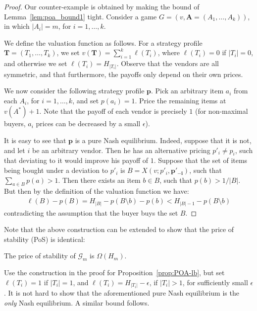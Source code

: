 \begin{proof}
Our counter-example is obtained by making the bound of
Lemma~\ref{lem:poa_bound1} tight. Consider a game $G =
(v,\mathbf{A}=(A_1,\ldots,A_k))$, in which $|A_i|=m$, for
$i=1,\ldots,k$.

We define the valuation function as follows. For a strategy
profile $\mathbf{T}=(T_1,\ldots,T_k)$, we set
$v(\mathbf{T})=\sum_{i=1}^k\ell(T_i)$, where $\ell(T_i)=0$ if
$|T_i|=0$, and otherwise we set $\ell(T_i)=H_{|T_i|}$. Observe that the vendors are all symmetric, and that
furthermore, the payoffs only depend on their own prices.

We now consider the following strategy profile $\mathbf{p}$.
Pick an arbitrary item
$a_i$ from each $A_i$, for $i=1,\ldots,k$, and set $p(a_i)=1$. Price the
remaining items at $v(A^*)+1$. Note that the payoff
of each vendor is precisely $1$ (for non-maximal buyers, $a_i$ prices can be decreased by a small $\epsilon$).

It is easy to see that $\mathbf{p}$ is a pure Nash
equilibrium. Indeed, suppose that it is not, and let $i$ be an
arbitrary vendor. Then he has an
alternative pricing $p'_i \neq p_i$, such that deviating to it would
improve his payoff of $1$. Suppose that the set of items being bought under a deviation
to $p'_i$ is $B=X(v;p'_i,\mathbf{p'_{-i}})$, such that $\sum_{a \in B}p(a)>1$. Then
there exists an item $b \in B$, such that $p(b) > 1/|B|$. But then by the
definition of the valuation function we have:
\small
\begin{align*}
  \ell(B) - p(B) = H_{|B|} - p(B \setminus b) - p(b) <
  H_{|B|-1} - p(B \setminus b)
\end{align*}
\normalsize
contradicting the assumption that the buyer buys the set $B$.
\end{proof}
Note that the above construction can be extended to show that the
price of stability (PoS) is identical:
\begin{corollary}
The price of stability of $\mathcal{G}_m$ is $\Omega(H_m)$.
\end{corollary}
\begin{proof-sketch}
  Use the construction in the proof for Proposition~\ref{prop:POA-lb},
  but set $\ell(T_i)=1$ if $|T_i|=1$, and
  $\ell(T_i)=H_{|T_i|}-\epsilon$, if $|T_i|>1$, for sufficiently small
  $\epsilon$. It is not hard to show that the aforementioned pure Nash
  equilibrium is the \emph{only} Nash equilibrium. A similar bound follows.
\end{proof-sketch}

